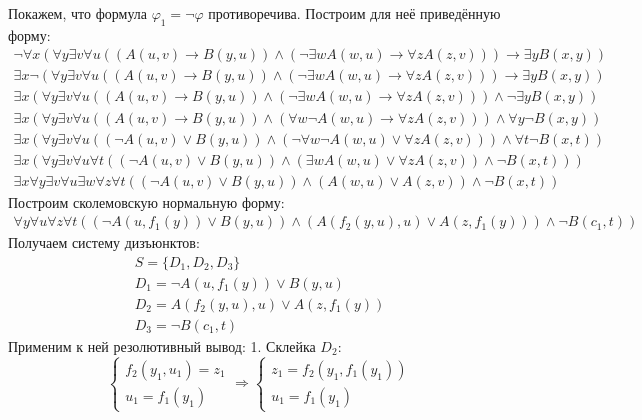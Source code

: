 \documentclass[11pt]{article}
\newcounter{th}\setcounter{th}{0}
\begin{document}
Покажем, что формула $\varphi_1 = \lnot \varphi$ противоречива. Построим для неё приведённую форму:
\begin{gather*}
\lnot \forall x (\forall y \exists v \forall u ((A(u, v) \to B(y, u)) \land (\lnot \exists w A(w, u) \to \forall z A(z, v))) \to \exists y B(x, y)) \\
\exists x \lnot (\forall y \exists v \forall u ((A(u, v) \to B(y, u)) \land (\lnot \exists w A(w, u) \to \forall z A(z, v))) \to \exists y B(x, y)) \\
\exists x (\forall y \exists v \forall u ((A(u, v) \to B(y, u)) \land (\lnot \exists w A(w, u) \to \forall z A(z, v))) \land \lnot \exists y B(x, y)) \\
\exists x (\forall y \exists v \forall u ((A(u, v) \to B(y, u)) \land (\forall w \lnot A(w, u) \to \forall z A(z, v))) \land \forall y \lnot B(x, y)) \\
\exists x (\forall y \exists v \forall u ((\lnot A(u, v) \lor B(y, u)) \land (\lnot \forall w \lnot A(w, u) \lor \forall z A(z, v))) \land \forall t \lnot B(x, t)) \\
\exists x (\forall y \exists v \forall u \forall t ((\lnot A(u, v) \lor B(y, u)) \land (\exists w A(w, u) \lor \forall z A(z, v)) \land \lnot B(x, t))) \\
\exists x \forall y \exists v \forall u \exists w \forall z \forall t ((\lnot A(u, v) \lor B(y, u)) \land (A(w, u) \lor A(z, v)) \land \lnot B(x, t))
\end{gather*}
Построим сколемовскую нормальную форму:
\begin{gather*}
\forall y \forall u \forall z \forall t ((\lnot A(u, f_1(y)) \lor B(y, u)) \land (A(f_2(y, u), u) \lor A(z, f_1(y))) \land \lnot B(c_1, t))
\end{gather*}
Получаем систему дизъюнктов:
\begin{gather*}
S = \{D_1, D_2, D_3\} \\
D_1 = \lnot A(u, f_1(y)) \lor B(y, u) \\
D_2 = A(f_2(y, u), u) \lor A(z, f_1(y)) \\
D_3 = \lnot B(c_1, t)
\end{gather*}
Применим к ней резолютивный вывод:
1. Склейка $D_2$:
\begin{equation*}
\begin{cases}
f_2(y_1, u_1) = z_1 \\
u_1 = f_1(y_1)
\end{cases}
\Rightarrow
\begin{cases}
z_1 = f_2(y_1, f_1(y_1)) \\
u_1 = f_1(y_1)
\end{cases}
\end{equation*}
\end{document}
